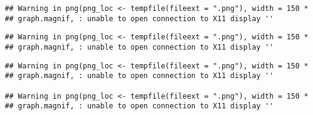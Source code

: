 \documentclass[]{article}
\begin{document}
\begin{verbatim}
## Warning in png(png_loc <- tempfile(fileext = ".png"), width = 150 *
## graph.magnif, : unable to open connection to X11 display ''
\end{verbatim}

\begin{verbatim}
## Warning in png(png_loc <- tempfile(fileext = ".png"), width = 150 *
## graph.magnif, : unable to open connection to X11 display ''
\end{verbatim}

\begin{verbatim}
## Warning in png(png_loc <- tempfile(fileext = ".png"), width = 150 *
## graph.magnif, : unable to open connection to X11 display ''

## Warning in png(png_loc <- tempfile(fileext = ".png"), width = 150 *
## graph.magnif, : unable to open connection to X11 display ''
\end{verbatim}
\end{document}

